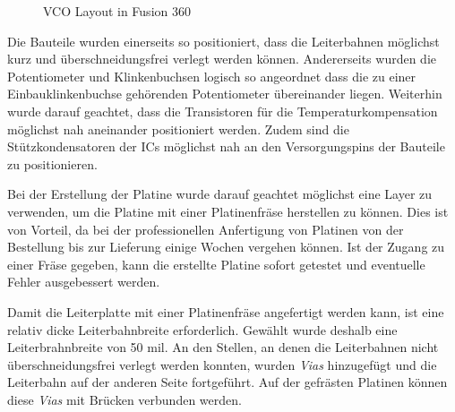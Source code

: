 \begin{figure}[h]
	\centering
	\setlength{\fboxsep}{1pt} %
	\setlength{\fboxrule}{1pt} %
	\caption{VCO Layout in Fusion 360}
	\label{fig:VCO Layout}
\end{figure}

Die Bauteile wurden einerseits so positioniert, dass die Leiterbahnen möglichst kurz und überschneidungsfrei verlegt werden können.
Andererseits wurden die Potentiometer und Klinkenbuchsen logisch so angeordnet dass die zu einer Einbauklinkenbuchse gehörenden Potentiometer übereinander liegen.
Weiterhin wurde darauf geachtet, dass die Transistoren für die Temperaturkompensation möglichst nah aneinander positioniert werden.
Zudem sind die Stützkondensatoren der ICs möglichst nah an den Versorgungspins der Bauteile zu positionieren.

Bei der Erstellung der Platine wurde darauf geachtet möglichst eine Layer zu verwenden, um die Platine mit einer Platinenfräse herstellen zu können.
Dies ist von Vorteil, da bei der professionellen Anfertigung von Platinen von der Bestellung bis zur Lieferung einige Wochen vergehen können.
Ist der Zugang zu einer Fräse gegeben, kann die erstellte Platine sofort getestet und eventuelle Fehler ausgebessert werden.

Damit die Leiterplatte mit einer Platinenfräse angefertigt werden kann, ist eine relativ dicke Leiterbahnbreite erforderlich. 
Gewählt wurde deshalb eine Leiterbrahnbreite von 50 mil.
An den Stellen, an denen die Leiterbahnen nicht überschneidungsfrei verlegt werden konnten, wurden \textit{Vias} hinzugefügt und die Leiterbahn auf der anderen Seite fortgeführt.
Auf der gefrästen Platinen können diese \textit{Vias} mit Brücken verbunden werden.

